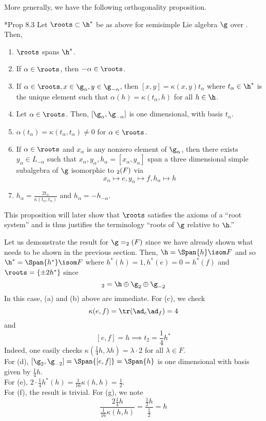 \documentclass[11pt,leqno,oneside]{amsart}
\numberwithin{thm}{section}
\begin{document}
More generally, we have the following orthogonality proposition.
\begin{prop}\label{orthogonality-props}
  \cite{humph}*{Prop 8.3} Let \(\roots \subset \h^*\) be as above for semisimple Lie algebra
  \(\g\) over . Then,
  \begin{enumerate}
  \item \(\roots\) spans \(\h^*\).
  \item If \(\alpha \in \roots\), then \(-\alpha \in \roots\).
  \item If \(\alpha \in \roots, x \in \g_\alpha, y \in \g_{-\alpha}\),
    then \([x,y] = \kappa(x,y)t_\alpha\) where \(t_\alpha \in \h^*\)
    is the unique element such that \(\alpha(h) = \kappa(t_\alpha,
    h)\) for all \(h \in \h\).
  \item Let \(\alpha \in \roots\). Then, \([\g_\alpha, \g_{-\alpha}]\)
    is one dimensional, with basis \(t_\alpha\).
  \item \(\alpha(t_\alpha) = \kappa(t_\alpha, t_\alpha) \neq 0\) for
    \(\alpha \in \roots\).
  \item If \(\alpha \in \roots\) and \(x_\alpha\) is any nonzero
    element of \(\g_\alpha\), then there exists \(y_\alpha \in
    L_{-\alpha}\) such that \(x_\alpha, y_\alpha, h_\alpha =
    [x_\alpha, y_\alpha]\) span a three dimensional simple subalgebra
    of \(\g\) isomorphic to \(\sl_2(F)\) via \[
      x_\alpha \mapsto e, y_\alpha \mapsto f, h_\alpha \mapsto h
    \]
  \item \(h_\alpha = \frac{2t_\alpha}{\kappa(t_\alpha, t_\alpha)}\)
    and \(h_\alpha = -h_{-\alpha}\).
  \end{enumerate}
\end{prop}
\begin{rmk}
  This proposition will later show that \(\roots\) satisfies the axioms of a
  ``root system'' and is thus justifies the terminology ``roots of
  \(\g\) relative to \(\h\).''
\end{rmk}
\begin{example}
  Let us demonstrate the result for \(\g = \sl_2(F)\) since we have
  already shown what needs to be shown in the previous section. Then, \(\h = \Span\{h\} \isom F\) and so
  \(\h^* 
  = \Span\{h^*\} \isom F\) where \(h^*(h) = 1, h^*(e) = 0 = h^*(f)\) and
  \(\roots = \{\pm 2 h^*\}\) since \[
    \sl_2 = \h \oplus \g_2 \oplus \g_{-2}
  \]
  In this case, (a) and (b) above are immediate. For (c), we check \[
    \kappa(e,f) = \tr(\ad_e \ad_f) = 4 
  \]
  and \[
    [e,f] = h \implies t_2 = \frac{1}{4} h^*
  \]
  Indeed, one easily checks \(\kappa(\frac{1}{4} h, \lambda h) =
  \lambda \cdot 2\) for all \(\lambda \in F\). \\

  For (d), \([\g_2, \g_{-2}] = \Span\{[e,f]\} = \Span\{h\}\) is one
  dimensional with basis given by \(\frac{1}{4} h\). \\

  For (e), \(2 \cdot \frac{1}{4} h^*(h) = \frac{1}{16} \kappa(h,h) =
  \frac{1}{2}\). \\

  For (f), the result is trivial. For (g), we note \[
    \frac{2 \frac{1}{4} h}{\frac{1}{16}\kappa(h,h)} =
    \frac{\frac{1}{2}h}{\frac{1}{2}} = h
  \]
\end{example}
\end{document}
